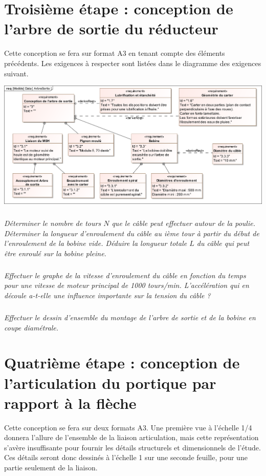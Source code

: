 \documentclass[10pt,fleqn]{article} %
\begin{document}
\section{Troisième étape : conception de l'arbre de sortie du réducteur}

Cette conception se fera sur format A3 en tenant compte des éléments précédents. Les exigences à respecter sont listées dans le diagramme des exigences suivant. 

\begin{center}
\includegraphics[width=\textwidth]{images/SysML/ArbreSortie}
\end{center}




\subparagraph{}
\textit{Déterminer le nombre de tours $N$ que le câble peut effectuer autour de la poulie. 
Déterminer la longueur d'enroulement du câble au ième tour à partir du début de l'enroulement de la bobine vide.
Déduire la longueur totale $L$ du câble qui peut être enroulé sur la bobine pleine.}

\subparagraph{}
\textit{Effectuer le graphe de la vitesse d'enroulement du câble en fonction du temps pour une vitesse de moteur principal de 1000 tours/min.
L'accélération qui en découle a-t-elle une influence importante sur la tension du câble ?}

\subparagraph{}
\textit{Effectuer le dessin d'ensemble du montage de l'arbre de sortie et de la bobine en coupe diamétrale.}


\section{Quatrième étape :  conception de l'articulation du portique par rapport à la flèche}

Cette conception se fera sur deux formats A3. Une première vue à l'échelle 1/4 donnera l'allure de l'ensemble de la liaison articulation, mais cette représentation s'avère insuffisante pour fournir les détails structurels et dimensionnels de l'étude. Ces détails seront donc dessinés à l'échelle 1 sur une seconde feuille, pour une partie seulement de la liaison. 
\end{document}
